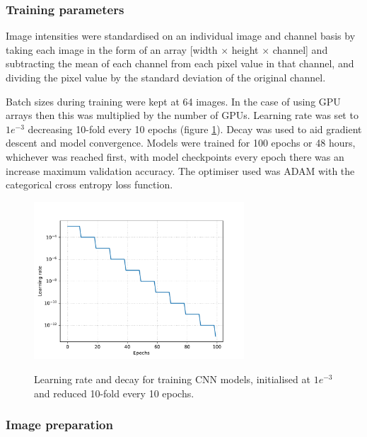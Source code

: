 \documentclass[a4paper,11pt,twoside,openright]{scrbook}
\begin{document}
\subsubsection{Training parameters}

Image intensities were standardised on an individual image and channel basis by taking each image in the form of an array [width $\times$ height $\times$ channel] and subtracting the mean of each channel from each pixel value in that channel, and dividing the pixel value by the standard deviation of the original channel.

Batch sizes during training were kept at 64 images.
In the case of using GPU arrays then this was multiplied by the number of GPUs.
Learning rate was set to $1e^{-3}$ decreasing 10-fold every 10 epochs (figure \ref{figure:learningRate}).
Decay was used to aid gradient descent and model convergence.
Models were trained for 100 epochs or 48 hours, whichever was reached first, with model checkpoints every epoch there was an increase maximum validation accuracy.
The optimiser used was ADAM \cite{Kingma2014} with the categorical cross entropy loss function.

\begin{figure}
    \captionsetup{width=0.8\textwidth}
    \caption[CNN learning rate and decay]{
Learning rate and decay for training CNN models, initialised at $1e^{-3}$ and reduced 10-fold every 10 epochs.
}
    \includegraphics[width=0.7\textwidth]{ch2learningRate}
    \label{figure:learningRate}
\end{figure}


\subsubsection{Image preparation}

\end{document}
